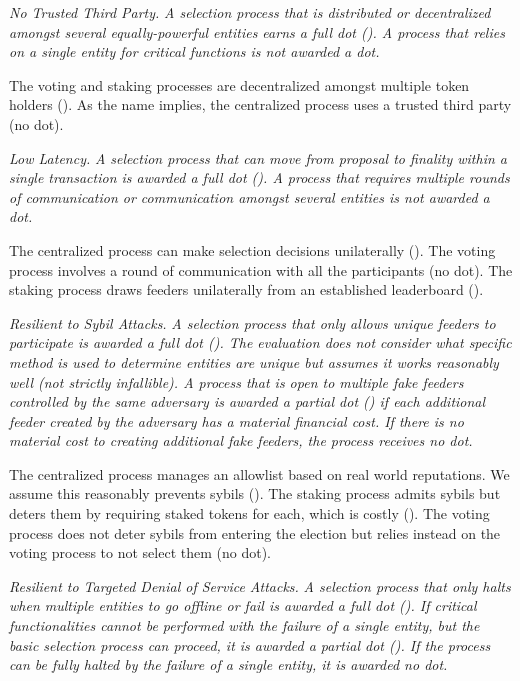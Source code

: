 \emph{No Trusted Third Party.} \textit{A selection process that is distributed or decentralized amongst several equally-powerful entities earns a full dot (\full). A process that relies on a single entity for critical functions is not awarded a dot.}

The voting and staking processes are decentralized amongst multiple token holders (\full). As the name implies, the centralized process uses a trusted third party (no dot).

\emph{Low Latency.} \textit{A selection process that can move from proposal to finality within a single transaction is awarded a full dot (\full). A process that requires multiple rounds of communication or communication amongst several entities is not awarded a dot.}

The centralized process can make selection decisions unilaterally (\full). The voting process involves a round of communication with all the participants (no dot). The staking process draws feeders unilaterally from an established leaderboard (\full). 

\emph{Resilient to Sybil Attacks.} \textit{A selection process that only allows unique feeders to participate is awarded a full dot (\full). The evaluation does not consider what specific method is used to determine entities are unique but assumes it works reasonably well (not strictly infallible). A process that is open to multiple fake feeders controlled by the same adversary is awarded a partial dot (\prt) if each additional feeder created by the adversary has a material financial cost. If there is no material cost to creating additional fake feeders, the process receives no dot.}

The centralized process manages an allowlist based on real world reputations. We assume this reasonably prevents sybils (\full). The staking process admits sybils but deters them by requiring staked tokens for each, which is costly (\prt). The voting process does not deter sybils from entering the election but relies instead on the voting process to not select them (no dot).   

\emph{Resilient to Targeted Denial of Service Attacks.} \textit{A selection process that only halts when multiple entities to go offline or fail is awarded a full dot (\full). If critical functionalities cannot be performed with the failure of a single entity, but the basic selection process can proceed, it is awarded a partial dot (\prt). If the process can be fully halted by the failure of a single entity, it is awarded no dot.}

